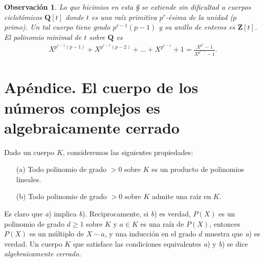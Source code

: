 \documentclass[bibtotoc,leqno,spanish]{amsbook}
\newcommand{\QQ}{\mathbf{Q}}
\newcommand{\ZZ}{\mathbf{Z}}
\numberwithin{equation}{section}
\theoremstyle{note}
\theoremstyle{note}
\theoremstyle{rem}
\newtheorem*{remark*}{Observaci\'on}
\numberwithin{theorem}{section}
\numberwithin{proposition}{section}
\numberwithin{definition}{section}
\numberwithin{lemma}{section}
\numberwithin{corollary}{section}
\numberwithin{example}{section}
\numberwithin{footnote}{section}%
\begin{document}
\begin{remark*}
Lo que hicimios en esta \S{} se extiende sin dificultad a cuerpos ciclot\'omicos $\QQ[t]$ donde $t$ es una
ra\'iz primitiva $p^{r}$-\'esima de la unidad ($p$ primo). Un tal cuerpo tiene grado $p^{r-1}(p-1)$ y su
anillo de enteros es $\ZZ[t]$. El polinomio minimal de $t$ sobre $\QQ$ es
\begin{gather*}
X^{p^{r-1}(p-1)}+X^{p^{r-1}(p-2)}+\dots+X^{p^{r-1}}+1=\frac{X^{p^{r}}-1}{X^{p^{r-1}}-1}.
\end{gather*}
\end{remark*}

\section*{Ap\'endice. El cuerpo de los n\'umeros complejos es algebraicamente cerrado}%

Dado un cuerpo $K$, consideremos las siguientes propiedades:
\begin{enumerate}
\item[(a)] Todo polinomio de grado $>0$ sobre $K$ es un producto de polinomios lineales.
\item[(b)] Todo polinomio de grado $>0$ sobre $K$ admite una ra\'iz en $K$.
\end{enumerate}
Es claro que {\itshape a}) implica {\itshape b}). Reciprocamente, si {\itshape b}) es verdad,
$P(X)$ es un polinomio de grado $d\geq 1$ sobre $K$ y $a\in K$ es una ra\'iz de $P(X)$, entonces
$P(X)$ es un m\'ultiplo de $X-a$, y una inducci\'on en el grado $d$ muestra que {\itshape a}) es verdad.
Un cuerpo $K$ que satisface las condiciones equivalentes {\itshape a}) y {\itshape b}) se dice
{\em algebraicamente cerrado.}
\end{document}
